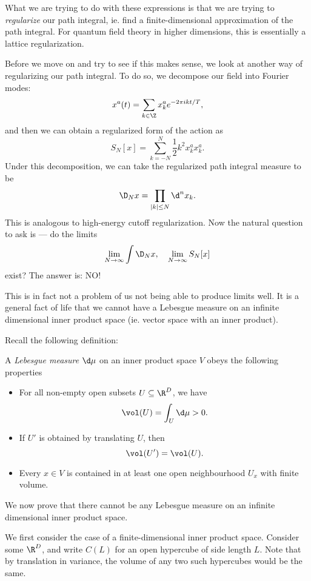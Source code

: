 \documentclass[a4paper]{article}
\begin{document}
What we are trying to do with these expressions is that we are trying to \emph{regularize} our path integral, ie. find a finite-dimensional approximation of the path integral. For quantum field theory in higher dimensions, this is essentially a lattice regularization.

Before we move on and try to see if this makes sense, we look at another way of regularizing our path integral. To do so, we decompose our field into Fourier modes:
\[
  x^a(t) = \sum_{k \in \Z} x_k^a e^{-2\pi i k t/T},
\]
and then we can obtain a regularized form of the action as
\[
  S_N[x] = \sum_{k = -N}^N \frac{1}{2} k^2 x^a_k x^a_k.
\]
Under this decomposition, we can take the regularized path integral measure to be
\[
  \D_N x = \prod_{|k| \leq N} \d^n x_k.
\]
This is analogous to high-energy cutoff regularization. Now the natural question to ask is --- do the limits
\[
  \lim_{N \to \infty} \int \D_N x,\quad \lim_{N \to \infty} S_N[x]
\]
exist? The answer is: NO!

This is in fact not a problem of us not being able to produce limits well. It is a general fact of life that we cannot have a Lebesgue measure on an infinite dimensional inner product space (ie. vector space with an inner product).

Recall the following definition:
\begin{defi}
  A \emph{Lebesgue measure} $\d \mu$ on an inner product space $V$ obeys the following properties
  \begin{itemize}
    \item For all non-empty open subsets $U \subseteq \R^D$, we have
      \[
        \vol(U) = \int_U \d \mu > 0.
      \]
    \item If $U'$ is obtained by translating $U$, then
      \[
        \vol(U') = \vol(U).
      \]
    \item Every $x \in V$ is contained in at least one open neighbourhood $U_x$ with finite volume.
  \end{itemize}
\end{defi}
We now prove that there cannot be any Lebesgue measure on an infinite dimensional inner product space.

We first consider the case of a finite-dimensional inner product space. Consider some $\R^D$, and write $C(L)$ for an open hypercube of side length $L$. Note that by translation in variance, the volume of any two such hypercubes would be the same.
\end{document}

